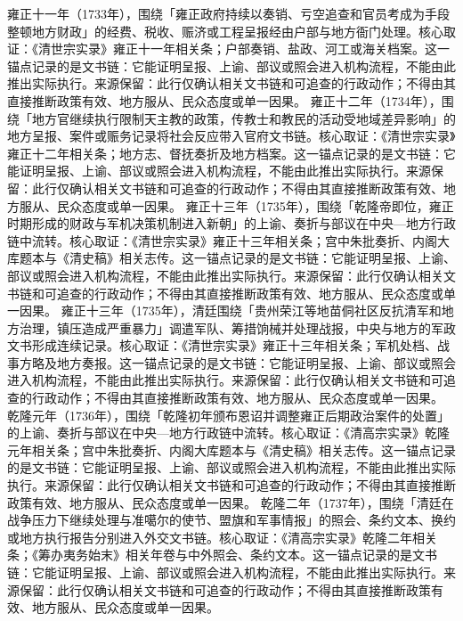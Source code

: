 雍正十一年（1733年），围绕「雍正政府持续以奏销、亏空追查和官员考成为手段整顿地方财政」的经费、税收、赈济或工程呈报经由户部与地方衙门处理。核心取证：《清世宗实录》雍正十一年相关条；户部奏销、盐政、河工或海关档案。这一锚点记录的是文书链：它能证明呈报、上谕、部议或照会进入机构流程，不能由此推出实际执行。来源保留：此行仅确认相关文书链和可追查的行政动作；不得由其直接推断政策有效、地方服从、民众态度或单一因果。
雍正十二年（1734年），围绕「地方官继续执行限制天主教的政策，传教士和教民的活动受地域差异影响」的地方呈报、案件或赈务记录将社会反应带入官府文书链。核心取证：《清世宗实录》雍正十二年相关条；地方志、督抚奏折及地方档案。这一锚点记录的是文书链：它能证明呈报、上谕、部议或照会进入机构流程，不能由此推出实际执行。来源保留：此行仅确认相关文书链和可追查的行政动作；不得由其直接推断政策有效、地方服从、民众态度或单一因果。
雍正十三年（1735年），围绕「乾隆帝即位，雍正时期形成的财政与军机决策机制进入新朝」的上谕、奏折与部议在中央—地方行政链中流转。核心取证：《清世宗实录》雍正十三年相关条；宫中朱批奏折、内阁大库题本与《清史稿》相关志传。这一锚点记录的是文书链：它能证明呈报、上谕、部议或照会进入机构流程，不能由此推出实际执行。来源保留：此行仅确认相关文书链和可追查的行政动作；不得由其直接推断政策有效、地方服从、民众态度或单一因果。
雍正十三年（1735年），清廷围绕「贵州荣江等地苗侗社区反抗清军和地方治理，镇压造成严重暴力」调遣军队、筹措饷械并处理战报，中央与地方的军政文书形成连续记录。核心取证：《清世宗实录》雍正十三年相关条；军机处档、战事方略及地方奏报。这一锚点记录的是文书链：它能证明呈报、上谕、部议或照会进入机构流程，不能由此推出实际执行。来源保留：此行仅确认相关文书链和可追查的行政动作；不得由其直接推断政策有效、地方服从、民众态度或单一因果。
乾隆元年（1736年），围绕「乾隆初年颁布恩诏并调整雍正后期政治案件的处置」的上谕、奏折与部议在中央—地方行政链中流转。核心取证：《清高宗实录》乾隆元年相关条；宫中朱批奏折、内阁大库题本与《清史稿》相关志传。这一锚点记录的是文书链：它能证明呈报、上谕、部议或照会进入机构流程，不能由此推出实际执行。来源保留：此行仅确认相关文书链和可追查的行政动作；不得由其直接推断政策有效、地方服从、民众态度或单一因果。
乾隆二年（1737年），围绕「清廷在战争压力下继续处理与准噶尔的使节、盟旗和军事情报」的照会、条约文本、换约或地方执行报告分别进入外交文书链。核心取证：《清高宗实录》乾隆二年相关条；《筹办夷务始末》相关年卷与中外照会、条约文本。这一锚点记录的是文书链：它能证明呈报、上谕、部议或照会进入机构流程，不能由此推出实际执行。来源保留：此行仅确认相关文书链和可追查的行政动作；不得由其直接推断政策有效、地方服从、民众态度或单一因果。
